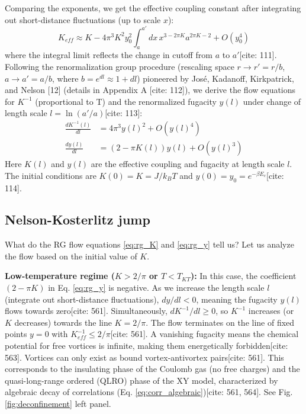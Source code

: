 \documentclass[11pt]{article}
\begin{document}
Comparing the exponents, we get the effective coupling constant after integrating out short-distance fluctuations (up to scale $x$):
\begin{equation}
K_{eff} \approx K - 4 \pi^3 K^2 y_0^2 \int_a^{a'} dx \, x^{3-2\pi K} a^{2\pi K - 2} + O(y_0^4) \label{eq:Keff_result}
\end{equation}
where the integral limit reflects the change in cutoff from $a$ to $a'$[cite: 111].
Following the renormalization group procedure (rescaling space $r \to r' = r/b$, $a \to a' = a/b$, where $b=e^{dl} \approx 1+dl$) pioneered by José, Kadanoff, Kirkpatrick, and Nelson [12] (details in Appendix A [cite: 112]), we derive the flow equations for $K^{-1}$ (proportional to T) and the renormalized fugacity $y(l)$ under change of length scale $l = \ln(a'/a)$[cite: 113]:
\begin{align}
\frac{d K^{-1}(l)}{dl} &= 4 \pi^3 y(l)^2 + O(y(l)^4) \label{eq:rg_K} \\
\frac{d y(l)}{dl} &= (2 - \pi K(l)) y(l) + O(y(l)^3) \label{eq:rg_y}
\end{align}
Here $K(l)$ and $y(l)$ are the effective coupling and fugacity at length scale $l$. The initial conditions are $K(0)=K = J/k_B T$ and $y(0)=y_0 = e^{-\beta E_c}$[cite: 114].

\subsection{Nelson-Kosterlitz jump}

What do the RG flow equations \eqref{eq:rg_K} and \eqref{eq:rg_y} tell us? Let us analyze the flow based on the initial value of $K$.

\textbf{Low-temperature regime ($K > 2/\pi$ or $T < T_{KT}$):}
In this case, the coefficient $(2 - \pi K)$ in Eq. \eqref{eq:rg_y} is negative. As we increase the length scale $l$ (integrate out short-distance fluctuations), $dy/dl < 0$, meaning the fugacity $y(l)$ flows towards zero[cite: 561]. Simultaneously, $dK^{-1}/dl \ge 0$, so $K^{-1}$ increases (or $K$ decreases) towards the line $K = 2/\pi$. The flow terminates on the line of fixed points $y=0$ with $K_{eff}^{-1} \le 2/\pi$[cite: 561]. A vanishing fugacity means the chemical potential for free vortices is infinite, making them energetically forbidden[cite: 563]. Vortices can only exist as bound vortex-antivortex pairs[cite: 561]. This corresponds to the insulating phase of the Coulomb gas (no free charges) and the quasi-long-range ordered (QLRO) phase of the XY model, characterized by algebraic decay of correlations (Eq. \ref{eq:corr_algebraic})[cite: 561, 564]. See Fig. \ref{fig:deconfinement} left panel.
\end{document}
